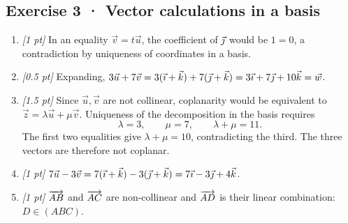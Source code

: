\subsection*{Exercise 3 · Vector calculations in a basis}\begin{enumerate}

\item \textit{[1 pt]} In an equality $\vec v=t\vec u$, the coefficient of $\vec{\jmath} $ would be $1=0$, a contradiction by uniqueness of coordinates in a basis.

\item \textit{[0.5 pt]} Expanding, $3\vec u+7\vec v=3(\vec{\imath} +\vec k)+7(\vec{\jmath} +\vec k)=3\vec{\imath} +7\vec{\jmath} +10\vec k=\vec w$.

\item \textit{[1.5 pt]} Since $\vec u,\vec v$ are not collinear, coplanarity would be equivalent to $\vec z=\lambda\vec u+\mu\vec v$. Uniqueness of the decomposition in the basis requires
\[\lambda=3,\qquad\mu=7,\qquad\lambda+\mu=11.\]
The first two equalities give $\lambda+\mu=10$, contradicting the third. The three vectors are therefore not coplanar.

\item \textit{[1 pt]} $7\vec u-3\vec v=7(\vec{\imath} +\vec k)-3(\vec{\jmath} +\vec k)=7\vec{\imath} -3\vec{\jmath} +4\vec k$.

\item \textit{[1 pt]} $\overrightarrow{AB}$ and $\overrightarrow{AC}$ are non-collinear and $\overrightarrow{AD}$ is their linear combination: $D\in(ABC)$.

\end{enumerate}


